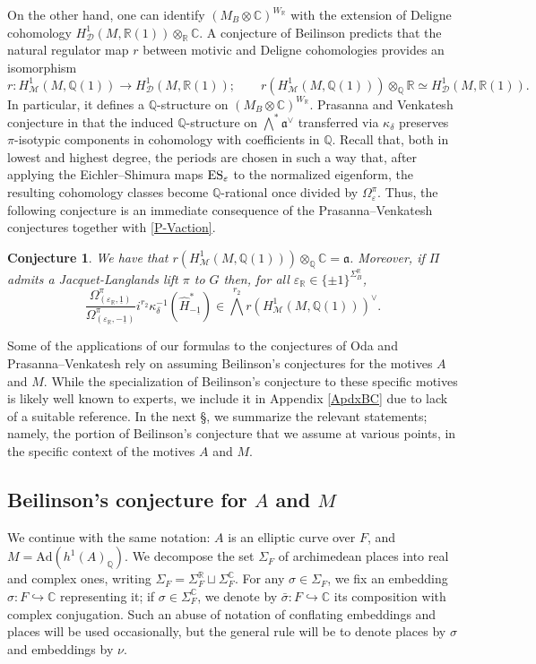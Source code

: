 \documentclass{amsart}
\newtheorem{conjecture}[theorem]{Conjecture}
\theoremstyle{definition}
\theoremstyle{remark}
\numberwithin{equation}{section}
\newcommand{\Q}{{\mathbb Q}}
\newcommand{\C}{{\mathbb C}}
\newcommand{\R}{{\mathbb R}}
\newcommand{\cD}{{\mathcal D}}
\newcommand{\cM}{{\mathcal M}}
\begin{document}
On the other hand, one can identify $(M_B\otimes\C)^{W_\R}$ with the extension of Deligne cohomology $H^1_{\cD}(M,\R(1))\otimes_\R\C$. A conjecture of Beilinson predicts that the natural regulator map $r$ between motivic and Deligne cohomologies provides an isomorphism 
\[
r:H^1_{\cM}(M,\Q(1))\rightarrow H^1_{\cD}(M,\R(1));\qquad r\left(H^1_{\cM}(M,\Q(1))\right)\otimes_\Q\R\simeq H^1_{\cD}(M,\R(1)).
\]
In particular, it defines a $\Q$-structure on $(M_B\otimes\C)^{W_\R}$. Prasanna and Venkatesh conjecture in \cite{PV} that the induced $\Q$-structure on $\bigwedge^\ast\mathfrak{a}^\vee$ transferred via $\kappa_\delta$ preserves $\pi$-isotypic components in cohomology with coefficients in $\Q$. Recall that, both in lowest and highest degree, the periods are chosen in such a way that, after applying the Eichler--Shimura maps ${\rm ES}_\varepsilon$ to the normalized eigenform, the resulting cohomology classes become $\Q$-rational once divided by $\Omega_\varepsilon^\pi$. Thus,  the following conjecture is an immediate consequence of the Prasanna--Venkatesh conjectures together with \eqref{P-Vaction}.
\begin{conjecture}\label{PVconj}
We have that $r(H^1_{\cM}(M,\Q(1)))\otimes_\Q\C=\mathfrak{a}$. Moreover, if $\Pi$ admits a Jacquet-Langlands lift $\pi$ to $G$ then, for all $\varepsilon_\R\in \{\pm 1\}^{\Sigma_B^\R}$,
    \[
    \frac{\Omega_{(\varepsilon_\R,\underline 1)}^\pi}{\Omega_{(\varepsilon_\R,-\underline 1)}^\pi}i^{r_2}\kappa_\delta^{-1}\left(\hat H_{-\underline 1}^\ast\right)\in \bigwedge^{{r_2}}r\left(H^1_{\cM}(M,\Q(1))\right)^\vee.
    \]
\end{conjecture}
Some of the applications of our formulas to the conjectures of Oda and Prasanna--Venkatesh rely on assuming Beilinson's conjectures for the motives $A$ and $M$. While the specialization of Beilinson's conjecture to these specific motives is likely well known to experts, we include it in Appendix \ref{ApdxBC} due to lack of a suitable reference. In the next \S, we summarize the relevant statements; namely, the portion of Beilinson's conjecture that we assume at various points, in the specific context of the motives $A$ and $M$.

\subsection{Beilinson's conjecture for $A$ and $M$} We continue with the same notation: $A$ is an elliptic curve over $F$, and $M = \mathrm{Ad}(h^1(A)_\Q)$. We decompose the set $\Sigma_F$ of archimedean places into real and complex ones, writing $\Sigma_F = \Sigma_F^\R \sqcup \Sigma_F^\C$. For any $\sigma \in \Sigma_F$, we fix an embedding $\sigma: F \hookrightarrow \C$ representing it; if $\sigma \in \Sigma_F^\C$, we denote by $\bar\sigma: F \hookrightarrow \C$ its composition with complex conjugation.
Such an abuse of notation of conflating embeddings and places will be used occasionally, but the general rule will be to denote places by $\sigma$ and embeddings by $\nu$.
\end{document}
